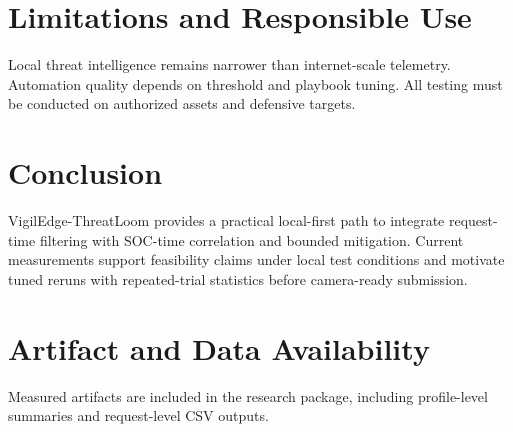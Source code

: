 \documentclass[conference]{IEEEtran}
\begin{document}
\section{Limitations and Responsible Use}
Local threat intelligence remains narrower than internet-scale telemetry. Automation quality depends on threshold and playbook tuning. All testing must be conducted on authorized assets and defensive targets.

\section{Conclusion}
VigilEdge-ThreatLoom provides a practical local-first path to integrate request-time filtering with SOC-time correlation and bounded mitigation. Current measurements support feasibility claims under local test conditions and motivate tuned reruns with repeated-trial statistics before camera-ready submission.

\section*{Artifact and Data Availability}
Measured artifacts are included in the research package, including profile-level summaries and request-level CSV outputs.



\end{document}
